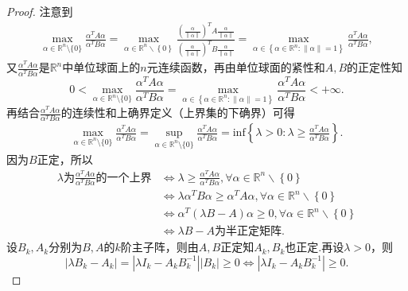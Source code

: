 \documentclass[../../main.tex]{subfiles}%
\begin{document}
\begin{proof}

注意到
\begin{align*}
\max_{\alpha \in \mathbb{R} ^n\setminus \{0\}} \frac{\alpha ^TA\alpha}{\alpha ^TB\alpha}=\underset{\alpha \in \mathbb{R} ^n\backslash \left\{ 0 \right\}}{\max}\frac{\left( \frac{\alpha}{\left\| \alpha \right\|} \right) ^TA\frac{\alpha}{\left\| \alpha \right\|}}{\left( \frac{\alpha}{\left\| \alpha \right\|} \right) ^TB\frac{\alpha}{\left\| \alpha \right\|}}=\underset{\alpha \in \left\{ \alpha \in \mathbb{R} ^n:\left\| \alpha \right\| =1 \right\}}{\max}\frac{\alpha ^TA\alpha}{\alpha ^TB\alpha},
\end{align*}
又$\frac{\alpha ^TA\alpha}{\alpha ^TB\alpha}$是$\mathbb{R} ^n$中单位球面上的$n$元连续函数，再由单位球面的紧性和$A,B$的正定性知
$$0<\max_{\alpha \in \mathbb{R} ^n\setminus \{0\}} \frac{\alpha ^TA\alpha}{\alpha ^TB\alpha}=\underset{\alpha \in \left\{ \alpha \in \mathbb{R} ^n:\left\| \alpha \right\| =1 \right\}}{\max}\frac{\alpha ^TA\alpha}{\alpha ^TB\alpha}<+\infty .$$
再结合$\frac{\alpha ^TA\alpha}{\alpha ^TB\alpha}$的连续性和上确界定义（上界集的下确界）可得
\begin{align}
\max_{\alpha \in \mathbb{R} ^n\setminus \{0\}} \frac{\alpha ^TA\alpha}{\alpha ^TB\alpha}=\mathop {\mathrm{sup}} \limits_{\alpha \in \mathbb{R} ^n\setminus \{0\}}\frac{\alpha ^TA\alpha}{\alpha ^TB\alpha}=\mathrm{inf}\left\{ \lambda >0:\lambda \geqslant \frac{\alpha ^TA\alpha}{\alpha ^TB\alpha} \right\}.\label{eq:423rewfj80rj893uf34t5321.1}
\end{align}
因为$B$正定，所以
\begin{align*}
\lambda \text{为}\frac{\alpha ^TA\alpha}{\alpha ^TB\alpha}\text{的一个上界}&\Longleftrightarrow \lambda \geqslant \frac{\alpha ^TA\alpha}{\alpha ^TB\alpha},\forall \alpha \in \mathbb{R} ^n\backslash \left\{ 0 \right\} \\
&\Longleftrightarrow \lambda \alpha ^TB\alpha \geqslant \alpha ^TA\alpha ,\forall \alpha \in \mathbb{R} ^n\backslash \left\{ 0 \right\} \\
&\Longleftrightarrow \alpha ^T\left( \lambda B-A \right) \alpha \geqslant 0,\forall \alpha \in \mathbb{R} ^n\backslash \left\{ 0 \right\} \\
&\Longleftrightarrow \lambda B-A\text{为半正定矩阵}.
\end{align*}
设$B_k,A_k$分别为$B,A$的$k$阶主子阵，则由$A,B$正定知$A_k,B_k$也正定.再设$\lambda >0$，则
$$\left| \lambda B_k-A_k \right|=\left| \lambda I_k-A_kB_{k}^{-1} \right|\left| B_k \right|\geqslant 0\Longleftrightarrow \left| \lambda I_k-A_kB_{k}^{-1} \right|\geqslant 0.$$

\end{proof}
\end{document}
